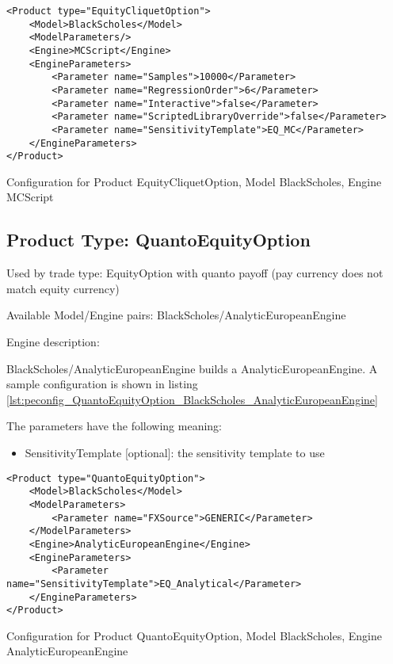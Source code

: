 \begin{longlisting}
\begin{verbatim}
<Product type="EquityCliquetOption">
    <Model>BlackScholes</Model>
    <ModelParameters/>
    <Engine>MCScript</Engine>
    <EngineParameters>
        <Parameter name="Samples">10000</Parameter>
        <Parameter name="RegressionOrder">6</Parameter>
        <Parameter name="Interactive">false</Parameter>
        <Parameter name="ScriptedLibraryOverride">false</Parameter>
        <Parameter name="SensitivityTemplate">EQ_MC</Parameter>
    </EngineParameters>
</Product>
\end{verbatim}
\caption{Configuration for Product EquityCliquetOption, Model BlackScholes, Engine MCScript}
\label{lst:peconfig_EquityCliquetOption_BlackScholes_MCScript}
\end{longlisting}

\subsection{Product Type: QuantoEquityOption}

Used by trade type: EquityOption with quanto payoff (pay currency does not match equity currency)

Available Model/Engine pairs: BlackScholes/AnalyticEuropeanEngine

Engine description:

BlackScholes/AnalyticEuropeanEngine builds a AnalyticEuropeanEngine. A sample configuration is shown in listing
\ref{lst:peconfig_QuantoEquityOption_BlackScholes_AnalyticEuropeanEngine}

The parameters have the following meaning:

\begin{itemize}
\item SensitivityTemplate [optional]: the sensitivity template to use 
\end{itemize}

\begin{longlisting}
\begin{verbatim}
<Product type="QuantoEquityOption">
    <Model>BlackScholes</Model>
    <ModelParameters>
        <Parameter name="FXSource">GENERIC</Parameter>
    </ModelParameters>
    <Engine>AnalyticEuropeanEngine</Engine>
    <EngineParameters>
        <Parameter name="SensitivityTemplate">EQ_Analytical</Parameter>
    </EngineParameters>
</Product>
\end{verbatim}
\caption{Configuration for Product QuantoEquityOption, Model BlackScholes, Engine AnalyticEuropeanEngine}
\label{lst:peconfig_QuantoEquityOption_BlackScholes_AnalyticEuropeanEngine}
\end{longlisting}

